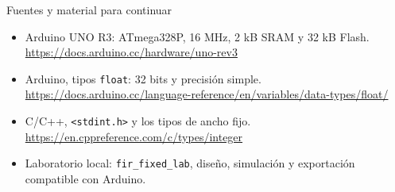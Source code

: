 \documentclass[aspectratio=169,10pt]{beamer}
\begin{document}
\begin{frame}{Fuentes y material para continuar}
  \footnotesize
  \begin{itemize}
    \item Arduino UNO R3: ATmega328P, 16 MHz, 2 kB SRAM y 32 kB Flash.\\
    \url{https://docs.arduino.cc/hardware/uno-rev3}
    \item Arduino, tipos \texttt{float}: 32 bits y precisión simple.\\
    \url{https://docs.arduino.cc/language-reference/en/variables/data-types/float/}
    \item C/C++, \texttt{<stdint.h>} y los tipos de ancho fijo.\\
    \url{https://en.cppreference.com/c/types/integer}
    \item Laboratorio local: \texttt{fir\_fixed\_lab}, diseño, simulación y
    exportación compatible con Arduino.
  \end{itemize}
\end{frame}
\end{document}
